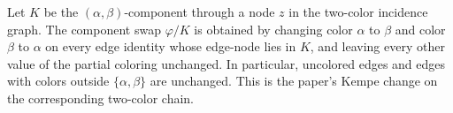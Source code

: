 \begin{definition}
Let $K$ be the $(\alpha,\beta)$-component through a node $z$ in the
two-color incidence graph.  The component swap
$\varphi/K$ is obtained by changing color $\alpha$ to $\beta$ and color
$\beta$ to $\alpha$ on every edge identity whose edge-node lies in $K$,
and leaving every other value of the partial coloring unchanged.  In
particular, uncolored edges and edges with colors outside
$\{\alpha,\beta\}$ are unchanged.  This is the paper's Kempe change on the
corresponding two-color chain.
\end{definition}
